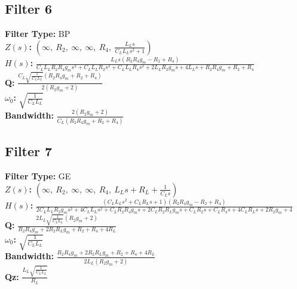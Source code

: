 \documentclass{article}
\begin{document}
\subsection*{Filter 6}
\textbf{Filter Type:} BP \\ 
\textbf{$Z(s)$:} $\left( \infty, \  R_{2}, \  \infty, \  \infty, \  R_{4}, \  \frac{L_{L} s}{C_{L} L_{L} s^{2} + 1}\right)$ \\ 
\textbf{$H(s)$:} $\frac{L_{L} s \left(R_{2} R_{4} g_{m} - R_{2} + R_{4}\right)}{C_{L} L_{L} R_{2} R_{4} g_{m} s^{2} + C_{L} L_{L} R_{2} s^{2} + C_{L} L_{L} R_{4} s^{2} + 2 L_{L} R_{2} g_{m} s + 4 L_{L} s + R_{2} R_{4} g_{m} + R_{2} + R_{4}}$ \\ 
\textbf{Q:} $\frac{C_{L} \sqrt{\frac{1}{C_{L} L_{L}}} \left(R_{2} R_{4} g_{m} + R_{2} + R_{4}\right)}{2 \left(R_{2} g_{m} + 2\right)}$ \\ 
\textbf{$\omega_0$:} $\sqrt{\frac{1}{C_{L} L_{L}}}$ \\ 
\textbf{Bandwidth:} $\frac{2 \left(R_{2} g_{m} + 2\right)}{C_{L} \left(R_{2} R_{4} g_{m} + R_{2} + R_{4}\right)}$ \\ 
\subsection*{Filter 7}
\textbf{Filter Type:} GE \\ 
\textbf{$Z(s)$:} $\left( \infty, \  R_{2}, \  \infty, \  \infty, \  R_{4}, \  L_{L} s + R_{L} + \frac{1}{C_{L} s}\right)$ \\ 
\textbf{$H(s)$:} $\frac{\left(C_{L} L_{L} s^{2} + C_{L} R_{L} s + 1\right) \left(R_{2} R_{4} g_{m} - R_{2} + R_{4}\right)}{2 C_{L} L_{L} R_{2} g_{m} s^{2} + 4 C_{L} L_{L} s^{2} + C_{L} R_{2} R_{4} g_{m} s + 2 C_{L} R_{2} R_{L} g_{m} s + C_{L} R_{2} s + C_{L} R_{4} s + 4 C_{L} R_{L} s + 2 R_{2} g_{m} + 4}$ \\ 
\textbf{Q:} $\frac{2 L_{L} \sqrt{\frac{1}{C_{L} L_{L}}} \left(R_{2} g_{m} + 2\right)}{R_{2} R_{4} g_{m} + 2 R_{2} R_{L} g_{m} + R_{2} + R_{4} + 4 R_{L}}$ \\ 
\textbf{$\omega_0$:} $\sqrt{\frac{1}{C_{L} L_{L}}}$ \\ 
\textbf{Bandwidth:} $\frac{R_{2} R_{4} g_{m} + 2 R_{2} R_{L} g_{m} + R_{2} + R_{4} + 4 R_{L}}{2 L_{L} \left(R_{2} g_{m} + 2\right)}$ \\ 
\textbf{Qz:} $\frac{L_{L} \sqrt{\frac{1}{C_{L} L_{L}}}}{R_{L}}$ \\ 
\end{document}
